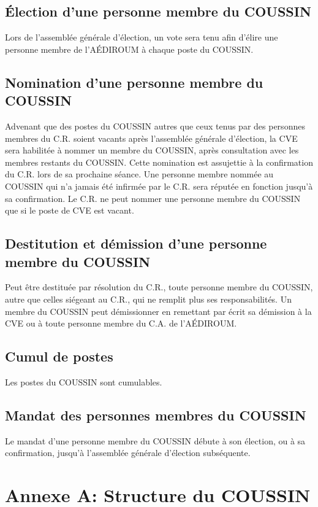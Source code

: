 \documentclass{aediroum}
\begin{document}
\subsection{Élection d'une personne membre du COUSSIN}\label{sec:election-coussin}
Lors de l'assemblée générale d'élection, un vote sera tenu afin d'élire une personne membre de l'AÉDIROUM à chaque poste du COUSSIN.

\subsection{Nomination d'une personne membre du COUSSIN}\label{sec:nomination-coussin}
Advenant que des postes du COUSSIN autres que ceux tenus par des personnes membres du C.R. soient vacants après l'assemblée générale d'élection, la CVE sera habilitée à nommer un membre du COUSSIN, après consultation avec les membres restants du COUSSIN. Cette nomination est assujettie à la confirmation du C.R. lors de sa prochaine séance. Une personne membre nommée au COUSSIN qui n'a jamais été infirmée par le C.R. sera réputée en fonction jusqu'à sa confirmation. Le C.R. ne peut nommer une personne membre du COUSSIN que si le poste de CVE est vacant.

\subsection{Destitution et démission d'une personne membre du COUSSIN}\label{sec:destitution-coussin}
Peut être destituée par résolution du C.R., toute personne membre du COUSSIN, autre que celles siégeant au C.R., qui ne remplit plus ses responsabilités. Un membre du COUSSIN peut démissionner en remettant par écrit sa démission à la CVE ou à toute personne membre du C.A. de l'AÉDIROUM.

\subsection{Cumul de postes}\label{sec:cumul}
Les postes du COUSSIN sont cumulables.

\subsection{Mandat des personnes membres du COUSSIN}\label{sec:mandat-coussin}
Le mandat d'une personne membre du COUSSIN débute à son élection, ou à sa confirmation, jusqu'à l'assemblée générale d'élection subséquente.

\section{Annexe A: Structure du COUSSIN}\label{sec:structure-coussin}
\end{document}
